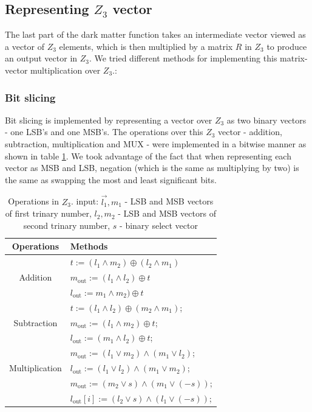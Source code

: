 \subsection{Representing $Z_3$ vector}

The last part of the dark matter function takes an intermediate vector viewed as a vector of $Z_3$ elements, which is then multiplied 
by a matrix $R$ in $Z_3$ to produce an output vector in $Z_3$. We tried different methods for implementing this matrix-vector multiplication over $Z_3$.:	

\subsubsection{Bit slicing} Bit slicing is implemented  by representing a vector over $Z_3$  as two binary vectors - one LSB's and one MSB's. The operations over this $Z_3$ vector - addition, subtraction, multiplication and MUX  - were implemented in a bitwise manner as shown in table \ref{tab:multicol}. We took advantage of the fact that when representing each vector as MSB and LSB, negation (which is the same as multiplying by two) is the same as swapping the most and least significant bits. 





\begin{table}[ht]
\caption{Operations in $Z_3$. input:   $\vec{l_1}, {m_1}$ - LSB and MSB vectors of first trinary number, 
	${l_2}, {m_2}$ - LSB and MSB vectors of second trinary number,  ${s}$ - binary select vector}
\begin{center}
\begin{tabular}{|c|l|}
    \hline
    \textbf{Operations} & \textbf{Methods}\\
    \hline
    \multirow{3}{*}{Addition} & ${t} := ({l_1 \wedge m_2}) \oplus ({l_2 \wedge m_1})$\\
    & $m_{\mathrm{out}} := ( l_1 \wedge  l_2 ) \oplus  t $ \\
    & $l_{\mathrm{out}} :=m_1 \wedge m_2 ) \oplus t $ \\
    \hline
    \multirow{3}{*}{Subtraction} & ${t} := ({l_1} \wedge {l_2}) \oplus ({m_2} \wedge {m_1})$;\\
    & $m_{\mathrm{out}} := (l_1 \wedge m_2 ) \oplus t$;\\
    & $l_{\mathrm{out}} := (m_1 \wedge l_2 ) \oplus t$; \\
    \hline
\multirow{3}{*}{Multiplication} & $m_{\mathrm{out}}:= (l_1 \vee m_2) \wedge   (m_1 \vee l_2)$; \\
    & $l_{\mathrm{out}} := (l_1 \vee l_2) \wedge     (m_1 \vee m_2)$;\\
    \hline
\multirow{3}{*}{MUX} & $m_{\mathrm{out}} :=( m_2 \vee s) \wedge (m_1 \vee (- s) )$; \\
    & $l_{\mathrm{out}}[i] :=( l_2 \vee s) \wedge (l_1 \vee (- s) )$; \\
    \hline

\end{tabular}
\end{center}
\label{tab:multicol}
\end{table}

